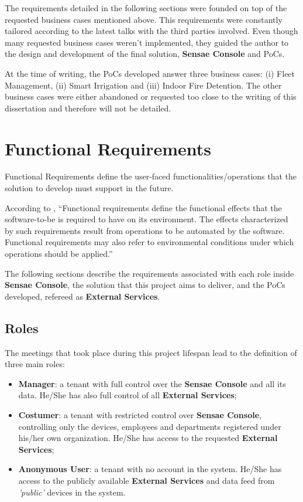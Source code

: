 The requirements detailed in the following sections were founded on top of the requested business cases mentioned above. This requirements were constantly tailored according to the latest talks with the third parties involved. Even though many requested business cases weren't implemented, they guided the author to the design and development of the final solution, \textbf{Sensae Console} and \gls{PoC}s.

At the time of writing, the \gls{PoC}s developed answer three business cases: (i) Fleet Management, (ii) Smart Irrigation and (iii) Indoor Fire Detention. The other business cases were either abandoned or requested too close to the writing of this dissertation and therefore will not be detailed.

\section{Functional Requirements}
\label{sec:requirements:functional}

Functional Requirements define the user-faced functionalities/operations that the solution to develop must support in the future.

According to \cite{van2009requirements}, ``Functional requirements define the functional effects that the software-to-be is required to have on its environment. The effects characterized by such requirements result from operations to be automated by the software. Functional requirements may also refer to environmental conditions under which operations should be applied.''

The following sections describe the requirements associated with each role inside \textbf{Sensae Console}, the solution that this project aims to deliver, and the \gls{PoC}s developed, refereed as \textbf{External Services}.

\subsection{Roles}
\label{subsec:requirements:functional:roles}

The meetings that took place during this project lifespan lead to the definition of three main roles:

\begin{itemize}
    \item \textbf{Manager}: a tenant with full control over the \textbf{Sensae Console} and all its data. He/She has also full control of all \textbf{External Services};
    \item \textbf{Costumer}: a tenant with restricted control over \textbf{Sensae Console}, controlling only the devices, employees and departments registered under his/her own organization. He/She has access to the requested \textbf{External Services};
    \item \textbf{Anonymous User}: a tenant with no account in the system. He/She has access to the publicly available \textbf{External Services} and data feed from \textit{'public'} devices in the system.
\end{itemize}

